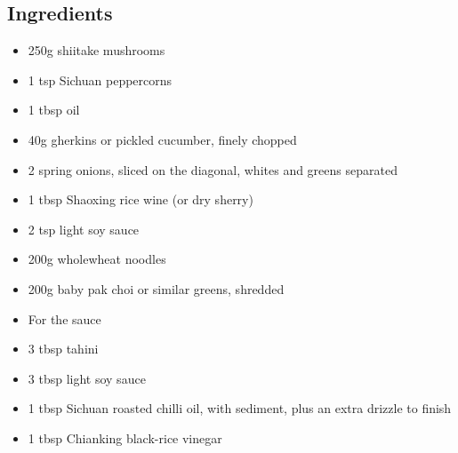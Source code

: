 \documentclass{book}
\begin{document}
\subsection*{Ingredients}
\begin{itemize}
\item 250g shiitake mushrooms
\item 1 tsp Sichuan peppercorns
\item 1 tbsp oil
\item 40g gherkins or pickled cucumber, finely chopped
\item 2 spring onions, sliced on the diagonal, whites and greens separated
\item 1 tbsp Shaoxing rice wine (or dry sherry)
\item 2 tsp light soy sauce
\item 200g wholewheat noodles
\item 200g baby pak choi or similar greens, shredded
\end{itemize}

\begin{itemize}
\item For the sauce
\item 3 tbsp tahini
\item 3 tbsp light soy sauce
\item 1 tbsp Sichuan roasted chilli oil, with sediment, plus an extra drizzle to finish
\item 1 tbsp Chianking black-rice vinegar
\end{itemize}
\end{document}

